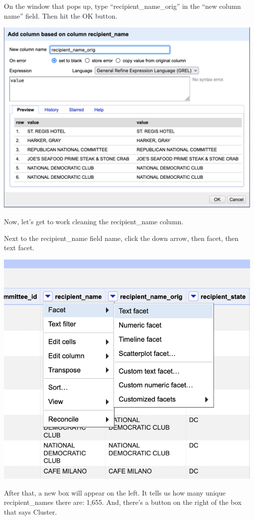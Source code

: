 \documentclass[
  letterpaper,
  DIV=11,
  numbers=noendperiod]{scrreprt}
\begin{document}
On the window that pops up, type ``recipient\_name\_orig'' in the ``new
column name'' field. Then hit the OK button.

\includegraphics{./images/open2b.png}

Now, let's get to work cleaning the recipient\_name column.

Next to the recipient\_name field name, click the down arrow, then
facet, then text facet.

\includegraphics{./images/open3.png}

After that, a new box will appear on the left. It tells us how many
unique recipient\_names there are: 1,655. And, there's a button on the
right of the box that says Cluster.
\end{document}
